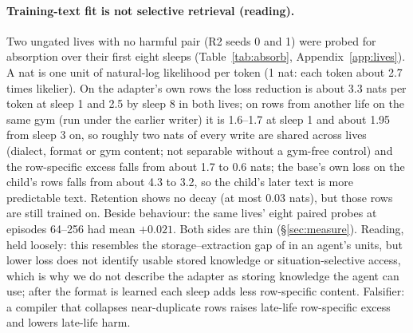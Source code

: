 \documentclass{article}
\begin{document}
\paragraph{Training-text fit is not selective retrieval (reading).} Two ungated lives with no harmful pair (R2 seeds 0 and 1) were probed for absorption over their first eight sleeps (Table~\ref{tab:absorb}, Appendix~\ref{app:lives}). A nat is one unit of natural-log likelihood per token (1 nat: each token about 2.7 times likelier). On the adapter's own rows the loss reduction is about 3.3 nats per token at sleep 1 and 2.5 by sleep 8 in both lives; on rows from another life on the same gym (run under the earlier writer) it is 1.6--1.7 at sleep 1 and about 1.95 from sleep 3 on, so roughly two nats of every write are shared across lives (dialect, format or gym content; not separable without a gym-free control) and the row-specific excess falls from about 1.7 to 0.6 nats; the base's own loss on the child's rows falls from about 4.3 to 3.2, so the child's later text is more predictable text. Retention shows no decay (at most 0.03 nats), but those rows are still trained on. Beside behaviour: the same lives' eight paired probes at episodes 64--256 had mean $+0.021$. Both sides are thin (\S\ref{sec:measure}). Reading, held loosely: this resembles the storage--extraction gap of \citet{allenzhu2023physics} in an agent's units, but lower loss does not identify usable stored knowledge or situation-selective access, which is why we do not describe the adapter as storing knowledge the agent can use; after the format is learned each sleep adds less row-specific content. Falsifier: a compiler that collapses near-duplicate rows raises late-life row-specific excess and lowers late-life harm.

\end{document}
